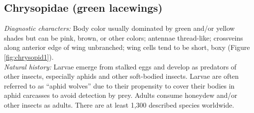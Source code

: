 \documentclass[letterpaper, 11pt]{article}
\begin{document}
\subsection{Chrysopidae (green lacewings)}
\noindent{}\textit{Diagnostic characters:} Body color usually dominated by green and/or yellow shades but can be pink, brown, or other colors; antennae thread-like; crossveins along anterior edge of wing unbranched; wing cells tend to be short, boxy (Figure \ref{fig:chrysopid1}).\\

\noindent{}\textit{Natural history:} Larvae emerge from stalked eggs and develop as predators of other insects, especially aphids and other soft-bodied insects. Larvae are often referred to as ``aphid wolves'' due to their propensity to cover their bodies in aphid carcasses to avoid detection by prey. Adults consume honeydew and/or other insects as adults. There are at least 1,300 described species worldwide.\\
\end{document}
